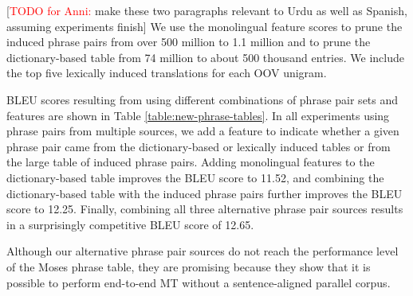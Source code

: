 \documentclass[11pt]{article}
\newcommand{\todopi}[2]{[\textcolor{red}{TODO for #1:} #2]}
\begin{document}
\todopi{Anni}{make these two paragraphs relevant to Urdu as well as Spanish, assuming experiments finish} We use the monolingual feature scores to prune the induced phrase pairs from over 500 million to 1.1 million and to prune the dictionary-based table from 74 million to about 500 thousand entries. We include the top five lexically induced translations for each OOV unigram.

BLEU scores resulting from using different combinations of phrase pair sets and features are shown in Table \ref{table:new-phrase-tables}. In all experiments using phrase pairs from multiple sources, we add a feature to indicate whether a given phrase pair came from the dictionary-based or lexically induced tables or from the large table of induced phrase pairs.
Adding monolingual features to the dictionary-based table improves the BLEU score to 
11.52, and combining the dictionary-based table with the induced phrase pairs further improves the BLEU score to 12.25. Finally, combining all three alternative phrase pair sources results in a surprisingly competitive BLEU score of 12.65. 

Although our alternative phrase pair sources do not reach the performance level of the Moses phrase table, they are promising because they show that it is possible to perform end-to-end MT without a sentence-aligned parallel corpus. %

\end{document}
